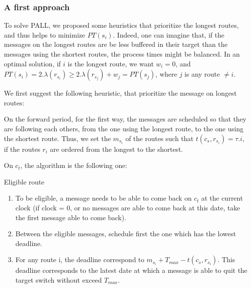 \documentclass[a4paper,10pt]{article}
\begin{document}
     \subsubsection{A first approach}
	
	To solve PALL, we proposed some heuristics that prioritize the longest routes, and thus helps to minimize $PT(s_i)$. Indeed, one can imagine that, if the messages on the longest routes are be less buffered in their target than the messages using the shortest routes, the process times might be balanced.
	In an optimal solution, if $i$ is the longest route, we want $w_i =0$, and $PT(s_i) = 2.\lambda(r_{s_i}) \geq  2.\lambda(r_{s_j}) + w_j = PT(s_j) $, where $j$ is any route $\neq i$.


     We first suggest the following heuristic, that prioritize the message on longest routes:

      On the forward period, for the first way, the messages are scheduled so that they are following each others, from the one using the longest route, to the one using the shortest route. Thus, we set the $m_{s_i}$ of the routes such that  $t(c_s,r_{s_i}) = \tau.i$, if the routes $r_i$ are ordered from the longest to the shortest.

      On $c_t$, the algorithm is the following one:


  \begin{algorithm}[H]

    \caption{Eligible route}
    \label{algorithm:Eligible}
    \begin{enumerate}
      
      \item To be eligible, a message needs to be able to come back on $c_t$ at the current clock (if clock = 0, or no messages are able to come back at this date, take the first message able to come back).
      \item Between the eligible messages, schedule first the one which has the lowest deadline.
      \item For any route i, the deadline correspond to $m_{s_i} + T_{max}-t(c_s,r_{s_i})$. This deadline corresponds to the latest date at which a message is able to quit the target switch without exceed $T_{max}$.

      \end{enumerate}
      
  \end{algorithm}
    
\end{document}
